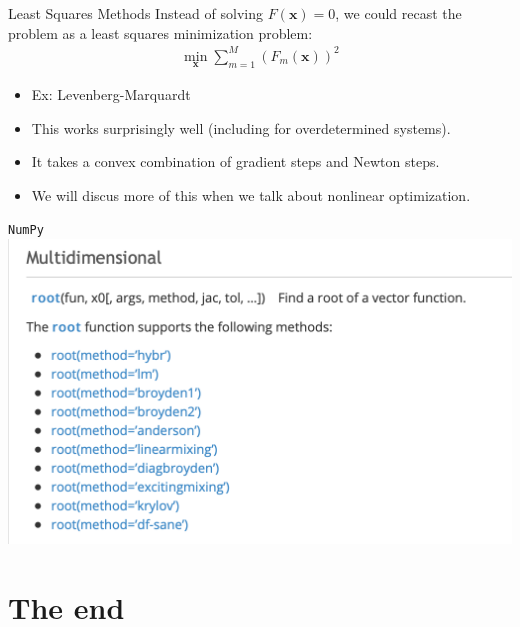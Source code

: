 \documentclass[xcolor=pdftex,dvipsnames,table,mathserif,aspectratio=169]{beamer}
\begin{document}
\begin{frame}{Least Squares Methods}
Instead of solving $F(\mathbf{x})=0$, we could recast the problem as a least squares minimization problem:
\begin{align*}
\min_{\mathbf{x}} \sum_{m=1}^M \left( F_m(\mathbf{x}) \right) ^2
\end{align*}
\begin{itemize}
\item Ex: \alert{Levenberg-Marquardt}
\item This works surprisingly well (including for overdetermined systems).
\item It takes a convex combination of \alert{gradient steps} and \alert{Newton steps}.
\item We will discus more of this when we talk about \alert{nonlinear optimization}.
\end{itemize}
\end{frame} 


\begin{frame}{\texttt{NumPy}}
\includegraphics[height=0.9\textheight]{./resources/scipy_roots2.png}
\end{frame}
\section{The end}
\end{document}
